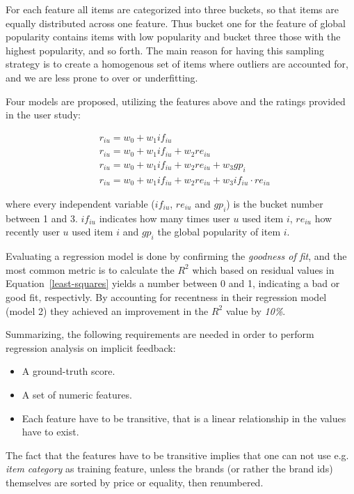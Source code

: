 For each feature all items are categorized into three buckets, so that items
are equally distributed across one feature. Thus bucket one for the feature of
global popularity contains items with low popularity and bucket three those
with the highest popularity, and so forth. The main reason for having this
sampling strategy is to create a homogenous set of items where outliers are
accounted for, and we are less prone to over or underfitting.

Four models are proposed, utilizing the features above and the ratings provided
in the user study:

\begin{equation}
  \begin{aligned}
    & r_{iu} = w_0 + w_1 if_{iu} \\
    & r_{iu} = w_0 + w_1 if_{iu} + w_2 re_{iu} \\
    & r_{iu} = w_0 + w_1 if_{iu} + w_2 re_{iu} + w_3 gp_{i} \\
    & r_{iu} = w_0 + w_1 if_{iu} + w_2 re_{iu} + w_3 if_{iu} \cdot re_{iu}
  \end{aligned}
\end{equation}

where every independent variable ($if_{iu}$, $re_{iu}$ and $gp_{i}$) is the
bucket number between 1 and 3. $if_{iu}$ indicates how many times user $u$ used
item $i$, $re_{iu}$ how recently user $u$ used item $i$ and $gp_{i}$ the global
popularity of item $i$.

Evaluating a regression model is done by confirming the \textit{goodness of
fit}, and the most common metric is to calculate the $R^2$ which based on
residual values in Equation~\ref{least-squares} yields a number between 0 and
1, indicating a bad or good fit, respectivly. By accounting for recentness in
their regression model (model 2) they achieved an improvement in the $R^2$
value by \textit{10\%}.

Summarizing, the following requirements are needed in order to perform
regression analysis on implicit feedback:

\begin{itemize}
  \item A ground-truth score.
  \item A set of numeric features.
  \item Each feature have to be transitive, that is a linear relationship in
  the values have to exist.
\end{itemize}

The fact that the features have to be transitive implies that one can not use
e.g. \textit{item category} as training feature, unless the brands (or rather
the brand ids) themselves are sorted by price or equality, then renumbered.

